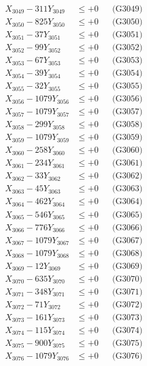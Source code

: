 \documentclass[a4paper,10pt]{article}
\begin{document}
{\begin{align}
X_{3049} - 311Y_{3049} &\leq +0 && \text{(G3049)} \\
X_{3050} - 825Y_{3050} &\leq +0 && \text{(G3050)} \\
\allowbreak
X_{3051} - 37Y_{3051} &\leq +0 && \text{(G3051)} \\
X_{3052} - 99Y_{3052} &\leq +0 && \text{(G3052)} \\
X_{3053} - 67Y_{3053} &\leq +0 && \text{(G3053)} \\
X_{3054} - 39Y_{3054} &\leq +0 && \text{(G3054)} \\
X_{3055} - 32Y_{3055} &\leq +0 && \text{(G3055)} \\
X_{3056} - 1079Y_{3056} &\leq +0 && \text{(G3056)} \\
X_{3057} - 1079Y_{3057} &\leq +0 && \text{(G3057)} \\
X_{3058} - 299Y_{3058} &\leq +0 && \text{(G3058)} \\
X_{3059} - 1079Y_{3059} &\leq +0 && \text{(G3059)} \\
X_{3060} - 258Y_{3060} &\leq +0 && \text{(G3060)} \\
\allowbreak
X_{3061} - 234Y_{3061} &\leq +0 && \text{(G3061)} \\
X_{3062} - 33Y_{3062} &\leq +0 && \text{(G3062)} \\
X_{3063} - 45Y_{3063} &\leq +0 && \text{(G3063)} \\
X_{3064} - 462Y_{3064} &\leq +0 && \text{(G3064)} \\
X_{3065} - 546Y_{3065} &\leq +0 && \text{(G3065)} \\
X_{3066} - 776Y_{3066} &\leq +0 && \text{(G3066)} \\
X_{3067} - 1079Y_{3067} &\leq +0 && \text{(G3067)} \\
X_{3068} - 1079Y_{3068} &\leq +0 && \text{(G3068)} \\
X_{3069} - 12Y_{3069} &\leq +0 && \text{(G3069)} \\
X_{3070} - 635Y_{3070} &\leq +0 && \text{(G3070)} \\
\allowbreak
X_{3071} - 348Y_{3071} &\leq +0 && \text{(G3071)} \\
X_{3072} - 71Y_{3072} &\leq +0 && \text{(G3072)} \\
X_{3073} - 161Y_{3073} &\leq +0 && \text{(G3073)} \\
X_{3074} - 115Y_{3074} &\leq +0 && \text{(G3074)} \\
X_{3075} - 900Y_{3075} &\leq +0 && \text{(G3075)} \\
X_{3076} - 1079Y_{3076} &\leq +0 && \text{(G3076)} \\

\end{align}}
\end{document}
